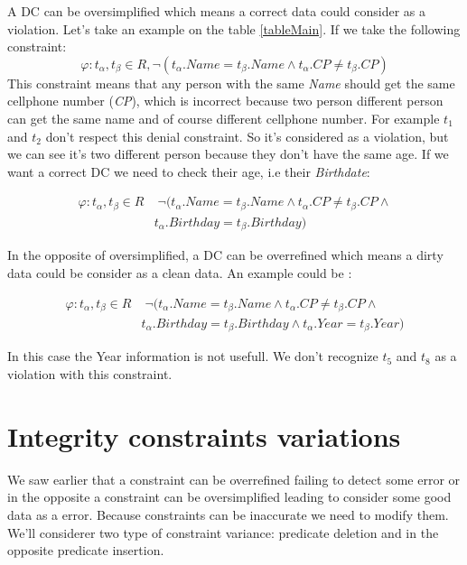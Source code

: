 \documentclass[letterpaper, 12pt]{report}
\begin{document}
A DC can be oversimplified which means a correct data could consider as a violation. Let's take an example on the table \ref{tableMain}. If we take the following constraint:
$$ \varphi : t_\alpha,t_\beta \in R, \neg(t_\alpha.Name = t_\beta.Name \wedge t_\alpha.CP \neq t_\beta.CP)$$
This constraint means that any person with the same \emph{Name} should get the same cellphone number (\emph{CP}), which is incorrect because two person different person can get the same name and of course different cellphone number. For example $t_1$ and $t_2$ don't respect this denial constraint. So it's considered as a violation, but we can see it's two different person because they don't have the same age. If we want a correct DC we need to check their age, i.e their \emph{Birthdate}:

\begin{displaymath}
  \begin{split}
    \varphi : t_\alpha,t_\beta \in R &\; \neg(t_\alpha.Name = t_\beta.Name \wedge t_\alpha.CP \neq t_\beta.CP \wedge \\
    & t_\alpha.Birthday = t_\beta.Birthday)
  \end{split}
\end{displaymath}

In the opposite of oversimplified, a DC can be overrefined which means a dirty data could be consider as a clean data. An example could be :

\begin{displaymath}
  \begin{split}
    \varphi : t_\alpha,t_\beta \in R &\; \neg(t_\alpha.Name = t_\beta.Name \wedge t_\alpha.CP \neq t_\beta.CP \wedge \\
    & t_\alpha.Birthday = t_\beta.Birthday \wedge t_\alpha.Year = t_\beta.Year)
  \end{split}
\end{displaymath}

In this case the Year information is not usefull. We don't recognize $t_5$ and $t_8$ as a violation with this constraint.

\section{Integrity constraints variations}

We saw earlier that a constraint can be overrefined failing to detect some error or in the opposite a constraint can be oversimplified leading to consider some good data as a error. Because constraints can be inaccurate we need to modify them. We'll considerer two type of constraint variance: predicate deletion and in the opposite predicate insertion.\\
\end{document}
